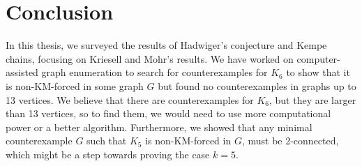 \chapter*{Conclusion}

In this thesis, we surveyed the results of Hadwiger's conjecture and Kempe chains, focusing on Kriesell and Mohr's results. 
We have worked on computer-assisted graph enumeration to search for counterexamples for $K_6$ to show that it is non-KM-forced in some graph $G$ but found no counterexamples in graphs up to 13 vertices.
We believe that there are counterexamples for $K_6$, but they are larger than 13 vertices, so to find them, 
we would need to use more computational power or a better algorithm. Furthermore, we showed that any minimal counterexample $G$ such that $K_5$ is non-KM-forced in $G$, 
must be 2-connected, which might be a step towards proving the case $k=5$.